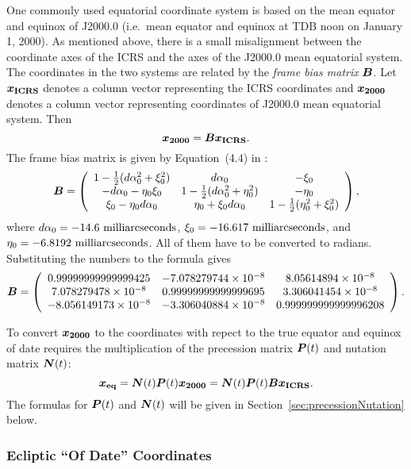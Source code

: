 \documentclass[12pt]{article}
\newcommand \beq {\begin{equation}}
\newcommand \eeq {\end{equation}}
\newcommand{\ve}[1]{\mbox{\boldmath $#1$}}
\newcommand{\expl}{\cite{expl}}
\begin{document}
\begin{CJK}{UTF8}{bkai}
One commonly used equatorial 
coordinate system is based on the mean equator and
equinox of J2000.0 (i.e.\ mean equator and equinox at TDB noon on January 1, 2000). 
As mentioned above, there is a small misalignment between the coordinate axes of 
the ICRS and the axes of the J2000.0 mean equatorial system. The coordinates 
in the two
systems are related by the {\em frame bias matrix} $\ve{B}$. Let $\ve{x_{\rm ICRS}}$ denotes 
a column vector representing the ICRS coordinates and $\ve{x_{2000}}$ denotes a column vector 
representing coordinates of J2000.0 mean equatorial system. Then 
\beq
  \ve{x_{2000}} = \ve{B} \ve{x_{\rm ICRS}} .
\eeq
The frame bias matrix is given by Equation~(4.4) in \expl:
\beq
  \ve{B} = \left( \begin{array}{ccc} 
1 - \frac{1}{2}(d\alpha_0^2 + \xi_0^2) & d\alpha_0 & -\xi_0 \\ 
-d\alpha_0 - \eta_0\xi_0 & 1 - \frac{1}{2}(d\alpha_0^2 + \eta_0^2) & -\eta_0 \\ 
\xi_0 - \eta_0 d\alpha_0 & \eta_0 + \xi_0 d\alpha_0 & 1 - \frac{1}{2}(\eta_0^2 + \xi_0^2) 
\end{array} \right) ,
\eeq
where $d\alpha_0 = -14.6~{\rm milliarcseconds}$, $\xi_0=-16.617~{\rm milliarcseconds}$, and 
$\eta_0=-6.8192~{\rm milliarcseconds}$. All of them have to be converted to radians.
Substituting the numbers to the formula gives 
\beq
  \ve{B} = \left( \begin{array}{ccc} 
   0.99999999999999425 & -7.078279744\times 10^{-8} & 8.05614894\times 10^{-8} \\ 
   7.078279478\times 10^{-8} & 0.99999999999999695 & 3.306041454\times 10^{-8} \\ 
   -8.056149173\times 10^{-8} & -3.306040884\times 10^{-8} & 0.999999999999996208 
  \end{array} \right) .
\label{eq:matB}
\eeq

To convert $\ve{x_{2000}}$ to the coordinates with repect to the 
true equator and equinox of date requires the multiplication of the precession 
matrix $\ve{P}(t)$ and nutation matrix $\ve{N}(t)$:
\beq
  \ve{x_{\rm eq}} = \ve{N}(t) \ve{P}(t) \ve{x_{2000}} = 
\ve{N}(t) \ve{P}(t) \ve{B} \ve{x_{\rm ICRS}} .
\eeq
The formulas for $\ve{P}(t)$ and $\ve{N}(t)$ will be given 
in Section~\ref{sec:precessionNutation} below.

\subsubsection{Ecliptic ``Of Date'' Coordinates}


\end{CJK}
\end{document}

